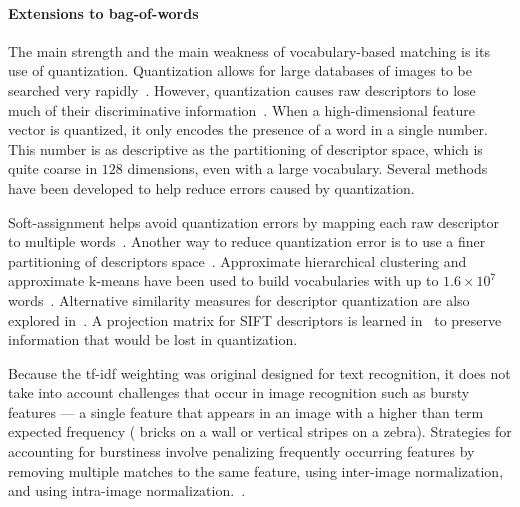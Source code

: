         \paragraph{Extensions to bag-of-words}
            The main strength and the main weakness of vocabulary-based matching is its use of quantization.
            Quantization allows for large databases of images to be searched very
            rapidly~\cite{nister_scalable_2006}. However, quantization causes raw descriptors to lose much of their
            discriminative information~\cite{philbin_lost_2008, boiman_defense_2008}. When a high-dimensional
            feature vector is quantized, it only encodes the presence of a word in a single number. This number is
            as descriptive as the partitioning of descriptor space, which is quite coarse in $128$ dimensions, even
            with a large vocabulary. Several methods have been developed to help reduce errors caused by
            quantization.

            Soft-assignment helps avoid quantization errors by mapping each raw descriptor to multiple
            words~\cite{philbin_lost_2008}. Another way to reduce quantization error is to use a finer partitioning
            of descriptors space~\cite{philbin_object_2007}. Approximate hierarchical clustering and approximate
            k-means have been used to build vocabularies with up to $1.6 \times 10^7$
            words~\cite{nister_scalable_2006, philbin_object_2007, mikulik_learning_2010}. Alternative similarity
            measures for descriptor quantization are also explored in~\cite{mikulik_learning_2010}. A projection
            matrix for SIFT descriptors is learned in~\cite{philbin_descriptor_2010} to preserve information that
            would be lost in quantization.

            Because the tf-idf weighting was original designed for text recognition, it does not take into account
            challenges that occur in image recognition such as bursty features --- a single feature that appears in
            an image with a higher than term expected frequency (\eg{} bricks on a wall or vertical stripes on a
            zebra). Strategies for accounting for burstiness involve penalizing frequently occurring features by
            removing multiple matches to the same feature, using inter-image normalization, and using intra-image
            normalization.~\cite{jegou_burstiness_2009}.
            
